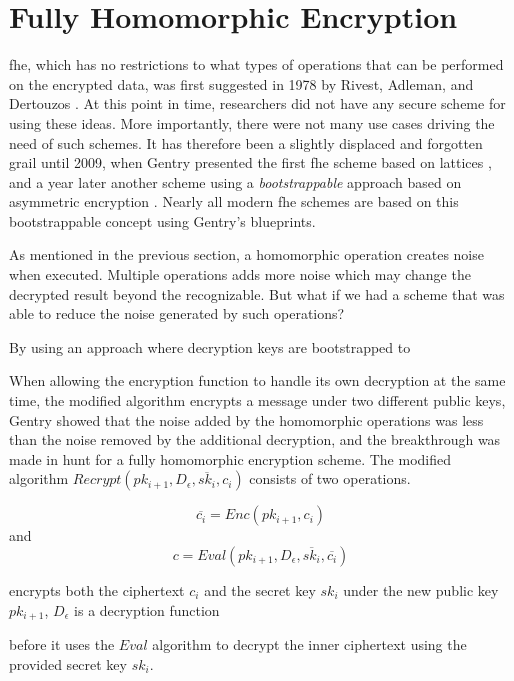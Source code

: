 \section{Fully Homomorphic Encryption}

\Gls{fhe}, which has no restrictions to what types of operations that can be performed on the encrypted data, was first suggested in 1978 by Rivest, Adleman, and Dertouzos \cite{rivest1978data}. At this point in time, researchers did not have any secure scheme for using these ideas. More importantly, there were not many use cases driving the need of such schemes. It has therefore been a slightly displaced and forgotten grail until 2009,
when Gentry presented the first \gls{fhe} scheme based on lattices \cite{Gentry_first_lattices}, and a year later another scheme using a \emph{bootstrappable} approach based on asymmetric encryption \citep{Gentry_computing_arb_func_enc_data}. Nearly all modern \gls{fhe} schemes are based on this bootstrappable concept using Gentry's blueprints. 

As mentioned in the previous section, a homomorphic operation creates noise when executed. Multiple operations adds more noise which may change the decrypted result beyond the recognizable. But what if we had a scheme that was able to reduce the noise generated by such operations? 


By using an approach where decryption keys are bootstrapped to 


When allowing the encryption function to handle its own decryption at the same time, the modified algorithm encrypts a message under two different public keys, Gentry showed that the noise added by the homomorphic operations was less than the noise removed by the additional decryption, and the breakthrough was made in hunt for a fully homomorphic encryption scheme. The modified algorithm $Recrypt(pk_{i+1}, D_{\epsilon}, \overline{sk_i}, c_i)$ consists of two operations.

\[\overline{c_i} = Enc(pk_{i+1}, c_i)\] and \[c = Eval(pk_{i+1}, D_{\epsilon}, \overline{sk_i}, \overline{c_i})\]

encrypts both the ciphertext $c_i$ and the secret key $sk_i$ under the new public key $pk_{i+1}$, $D_{\epsilon}$ is a decryption function 



 before it uses the $Eval$ algorithm to decrypt the inner ciphertext using the provided secret key $sk_i$. 





